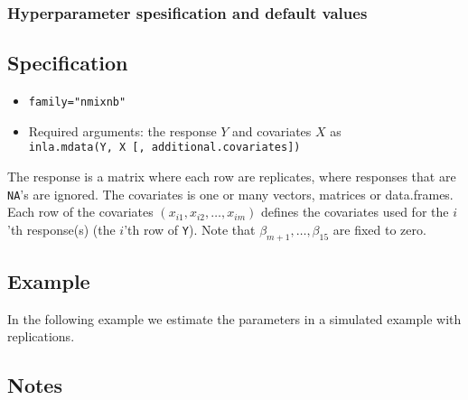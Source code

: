 \documentclass[a4paper,11pt]{article}
\def\mmax{15}
\begin{document}
\subsubsection*{Hyperparameter spesification and default values}


\subsection*{Specification}

\begin{itemize}
\item \texttt{family="nmixnb"}
\item Required arguments: the response $Y$ and covariates $X$ as\\
    \verb|inla.mdata(Y, X [, additional.covariates])|
\end{itemize}
The response is a matrix where each row are replicates, where
responses that are \texttt{NA}'s are ignored. The covariates is one or
many vectors, matrices or data.frames. Each row of the covariates
$(x_{i1}, x_{i2}, \ldots, x_{im})$ defines the covariates used for the
$i$'th response(s) (the $i$'th row of \texttt{Y}). Note that
$\beta_{m+1}, \ldots, \beta_{\mmax}$ are fixed to zero.


\subsection*{Example}

In the following example we estimate the parameters in a simulated
example with replications.



\subsection*{Notes}
\end{document}
